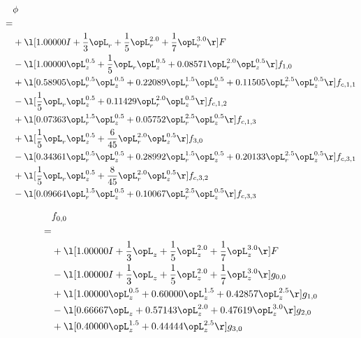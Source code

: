 \begin{alignat}{2} 
\label{eq:scalarFlux_0} 
& \phi \nonumber \\ 
 = \\ 
& + \l[  1.00000 I + \frac{1}{3} \opL_r + \frac{1}{5} \opL_r^{2.0} + \frac{1}{7} \opL_r^{3.0}  \r] F \nonumber \\ 
& - \l[  1.00000 \opL_z^{0.5} + \frac{1}{5} \opL_r \opL_z^{0.5} +  0.08571 \opL_r^{2.0} \opL_z^{0.5}  \r] f_{1,0} \nonumber \\ 
& + \l[  0.58905 \opL_r^{0.5} \opL_z^{0.5} +  0.22089 \opL_r^{1.5} \opL_z^{0.5} +  0.11505 \opL_r^{2.5} \opL_z^{0.5}  \r] f_{c,1,1} \nonumber \\ 
& - \l[ \frac{1}{5} \opL_r \opL_z^{0.5} +  0.11429 \opL_r^{2.0} \opL_z^{0.5}  \r] f_{c,1,2} \nonumber \\ 
& + \l[  0.07363 \opL_r^{1.5} \opL_z^{0.5} +  0.05752 \opL_r^{2.5} \opL_z^{0.5}  \r] f_{c,1,3} \nonumber \\ 
& + \l[ \frac{1}{5} \opL_r \opL_z^{0.5} + \frac{6}{45} \opL_r^{2.0} \opL_z^{0.5}  \r] f_{3,0} \nonumber \\ 
& - \l[  0.34361 \opL_r^{0.5} \opL_z^{0.5} +  0.28992 \opL_r^{1.5} \opL_z^{0.5} +  0.20133 \opL_r^{2.5} \opL_z^{0.5}  \r] f_{c,3,1} \nonumber \\ 
& + \l[ \frac{1}{5} \opL_r \opL_z^{0.5} + \frac{8}{45} \opL_r^{2.0} \opL_z^{0.5}  \r] f_{c,3,2} \nonumber \\ 
& - \l[  0.09664 \opL_r^{1.5} \opL_z^{0.5} +  0.10067 \opL_r^{2.5} \opL_z^{0.5}  \r] f_{c,3,3} \nonumber \\ 
\end{alignat} 


\begin{alignat}{2} 
\label{eq:f_00_0} 
& f_{0,0} \nonumber \\ 
 = \\ 
& + \l[  1.00000 I + \frac{1}{3} \opL_z + \frac{1}{5} \opL_z^{2.0} + \frac{1}{7} \opL_z^{3.0}  \r] F \nonumber \\ 
& - \l[  1.00000 I + \frac{1}{3} \opL_z + \frac{1}{5} \opL_z^{2.0} + \frac{1}{7} \opL_z^{3.0}  \r] g_{0,0} \nonumber \\ 
& + \l[  1.00000 \opL_z^{0.5} +  0.60000 \opL_z^{1.5} +  0.42857 \opL_z^{2.5}  \r] g_{1,0} \nonumber \\ 
& - \l[  0.66667 \opL_z +  0.57143 \opL_z^{2.0} +  0.47619 \opL_z^{3.0}  \r] g_{2,0} \nonumber \\ 
& + \l[  0.40000 \opL_z^{1.5} +  0.44444 \opL_z^{2.5}  \r] g_{3,0} \nonumber \\ 
\end{alignat} 



